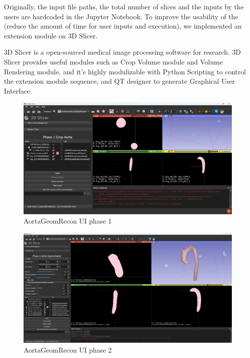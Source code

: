Originally, the input file paths, the total number of slices and the inputs by the users are hardcoded in the Jupyter Notebook. To improve the usability of the \progname{} (reduce the amount of time for user inputs and execution), we implemented an extension module on 3D Slicer. 

3D Slicer is a open-sourced medical image processing software for research. 3D Slicer provides useful modules such as Crop Volume module and Volume Rendering module, and it's highly modulizable with Python Scripting to control the extension module sequence, and QT designer to generate Graphical User Interface.

\begin{figure}[ht]
    \centering
    \includegraphics[width=\textwidth]{figures/Sample/SlicerUI.png}
    \caption[AortaGeomRecon phase 1 User Interface]{AortaGeomRecon UI phase 1}
    \label{fig_UI_1}
\end{figure}

\begin{figure}[ht]
    \centering
    \includegraphics[width=\textwidth]{figures/Sample/SlicerUI_2.png}
    \caption[AortaGeomRecon phase 2 User Interface]{AortaGeomRecon UI phase 2}
    \label{fig_UI_2}
\end{figure}

